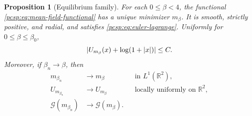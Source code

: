 \documentclass[11pt,reqno]{amsart}
\numberwithin{equation}{section}
\theoremstyle{plain}
\newtheorem{prop}[prop]{Proposition}
\theoremstyle{definition}
\DeclarePairedDelimiter{\abs}{\lvert}{\rvert}
\newcommand{\R}{\mathbb R}
\newcommand{\be}{\beta}
\newcommand{\Gcal}{\mathcal G}
\begin{document}
\begin{prop}[Equilibrium family]\label{pcsp:prop:equilibrium-family}
For each $0\leq\be<4$, the functional \eqref{pcsp:eq:mean-field-functional} has a unique minimizer $m_\be$.  It is smooth, strictly positive, and radial, and satisfies \eqref{pcsp:eq:euler-lagrange}.  Uniformly for $0\leq\be\leq\be_0$,
\begin{equation}\label{pcsp:eq:potential-asymptotic}
 \abs{U_{m_\be}(x)+\log(1+|x|)}\leq C.
\end{equation}
Moreover, if $\be_n\to\be$, then
\begin{align}
 m_{\be_n}&\longrightarrow m_\be
 &&\text{in }L^1(\R^2),\label{pcsp:eq:m-continuity}\\
 U_{m_{\be_n}}&\longrightarrow U_{m_\be}
 &&\text{locally uniformly on }\R^2,\label{pcsp:eq:U-continuity}\\
 \Gcal(m_{\be_n})&\longrightarrow\Gcal(m_\be).\label{pcsp:eq:G-continuity}
\end{align}
\end{prop}
\end{document}
